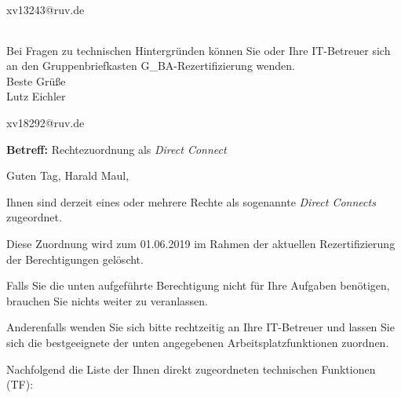 \documentclass[a4paper,landscape,12pt]{letter}
\begin{document}
\begin{letter}{xv13243@ruv.de\hfill \break}
\begin{tiny}
\begin{longtable}{|p{35mm}|p{15mm}|p{25mm}|p{10mm}|p{40mm}|p{50mm}|p{50mm}|}
\hline
		\end{longtable}
		\end{tiny}
	
\begin{minipage}{\textwidth}
			Bei Fragen zu technischen Hintergründen können Sie 
			oder Ihre IT-Betreuer sich an den Gruppenbriefkasten 
			G\_BA-Rezertifizierung
			wenden.\\
			\linebreak
			Beste Grüße\\
			Lutz Eichler
	\end{minipage}
	\end{letter}
	
\begin{letter}{xv18292@ruv.de\hfill \break}
\begin{normalsize}
	\opening{\textbf{Betreff:} Rechtezuordnung als \emph{Direct Connect}}
	\begin{normalsize} \hfill
	\end{normalsize}

	\begin{normalsize}
		Guten Tag, 
	Harald Maul, \hfill \break
	\end{normalsize}
	\end{normalsize}
	
\begin{normalsize}
	Ihnen sind derzeit eines oder mehrere Rechte als sogenannte \emph{Direct Connects} zugeordnet.
	
	Diese Zuordnung wird zum 01.06.2019 im Rahmen der aktuellen Rezertifizierung der Berechtigungen gelöscht.
	
	Falls Sie die unten aufgeführte Berechtigung nicht für Ihre Aufgaben benötigen, 
	brauchen Sie nichts weiter zu veranlassen.
	
	Anderenfalls wenden Sie sich bitte rechtzeitig an Ihre IT-Betreuer 
	und lassen Sie sich die bestgeeignete der unten angegebenen Arbeitsplatzfunktionen zuordnen.
	\end{normalsize}
	
\begin{normalsize}
	Nachfolgend die Liste der Ihnen direkt zugeordneten technischen Funktionen (TF):


\end{normalsize}
\end{letter}
\end{document}
